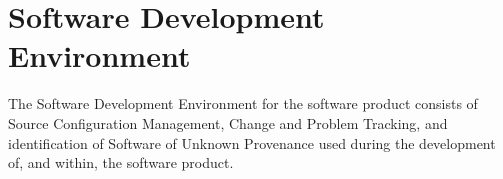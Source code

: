 \section{Software Development Environment}
The Software Development Environment for the software product consists of Source
Configuration Management, Change and Problem Tracking, and identification of
Software of Unknown Provenance used during the development of, and within, the
software product.
